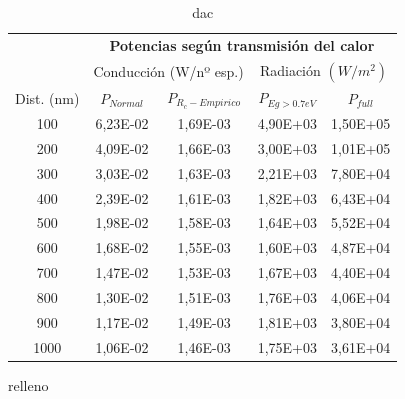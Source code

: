\begin{table}[h]
	\centering
		\begin{tabular}{|c||c|c||c|c|}
		\hline
\multirow{2}{*}{ }& \multicolumn{4}{c|}{\textbf{\large Potencias según transmisión del calor}}\\ \cline{2-5}
& \multicolumn{2}{c||}{Conducción (W/nº esp.)}& \multicolumn{2}{c|}{Radiación $(W/m^2)$}\\ \hline
Dist. (nm)&$P_{Normal}$&$P_{R_c-Empirico}$&$P_{Eg>0.7eV}$&$P_{full}$\\ \hline \hline
100&6,23E-02&1,69E-03&4,90E+03&1,50E+05\\ \hline 
200&4,09E-02&1,66E-03&3,00E+03&1,01E+05\\ \hline 
300&3,03E-02&1,63E-03&2,21E+03&7,80E+04\\ \hline 
400&2,39E-02&1,61E-03&1,82E+03&6,43E+04\\ \hline 
500&1,98E-02&1,58E-03&1,64E+03&5,52E+04\\ \hline 
600&1,68E-02&1,55E-03&1,60E+03&4,87E+04\\ \hline 
700&1,47E-02&1,53E-03&1,67E+03&4,40E+04\\ \hline 
800&1,30E-02&1,51E-03&1,76E+03&4,06E+04\\ \hline 
900&1,17E-02&1,49E-03&1,81E+03&3,80E+04\\ \hline 
1000&1,06E-02&1,46E-03&1,75E+03&3,61E+04\\ \hline 
		\end{tabular}
	\caption{dac}
	\label{tab:dac}
\end{table}

relleno


